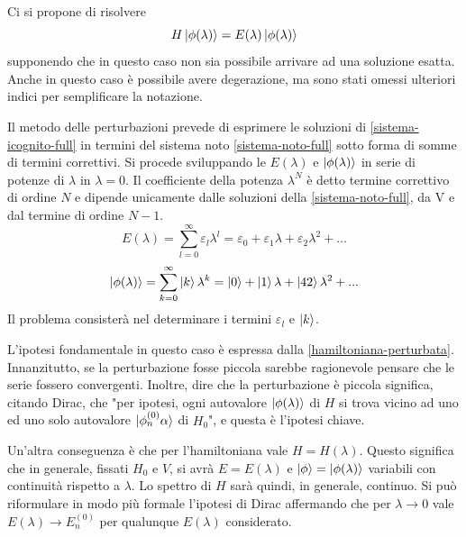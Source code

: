 \documentclass[a4paper, 10pt]{article}
\newcommand{\reff}[1]{\mbox{\ref{#1}}}
\begin{document}
Ci si propone di risolvere
\begin{equation}
	\label{sistema-icognito-full}
	H \ket{\phi(\lambda)} = E(\lambda) \ket{\phi(\lambda)}
\end{equation}
supponendo che in questo caso non sia possibile arrivare ad una soluzione esatta. Anche in questo caso è possibile avere degerazione, ma sono stati omessi ulteriori indici per semplificare la notazione.

Il metodo delle perturbazioni prevede di esprimere le soluzioni di \reff{sistema-icognito-full} in termini del sistema noto \reff{sistema-noto-full} sotto forma di somme di termini correttivi. Si procede sviluppando le $E(\lambda)$ e $\ket{\phi(\lambda)}$ in serie di potenze di $\lambda$ in $\lambda = 0$. Il coefficiente della potenza $\lambda^N$ è detto termine correttivo di ordine $N$ e dipende unicamente dalle soluzioni della \reff{sistema-noto-full}, da V e dal termine di ordine $N-1$.
\begin{equation}
	\label{serie-generale-E}
	E(\lambda) = \sum_{l = 0}^{\infty} \varepsilon_l \lambda^l = \varepsilon_0 + \varepsilon_1 \lambda+ \varepsilon_2 \lambda^2 + ...
\end{equation}
\begin{equation}
	\label{serie-generale-phi}
	\ket{\phi(\lambda)} = \sum_{k = 0}^{\infty} \ket{k} \lambda^k = \ket{0} + \ket{1}\lambda + \ket{42}\lambda^2 + ...
\end{equation}
Il problema consisterà nel determinare i termini $\varepsilon_l$ e $\ket{k}$.

L'ipotesi fondamentale in questo caso è espressa dalla \reff{hamiltoniana-perturbata}. Innanzitutto, se la perturbazione fosse piccola sarebbe ragionevole pensare che le serie fossero convergenti. Inoltre, dire che la perturbazione è piccola significa, citando Dirac, che "per ipotesi, ogni autovalore $\ket{\phi(\lambda)}$ di $H$ si trova vicino ad uno ed uno solo autovalore $\ket{\phi_n^{(0)} \alpha}$ di $H_0$", e questa è l'ipotesi chiave.

Un'altra conseguenza è che per l'hamiltoniana vale $H = H(\lambda)$. Questo significa che in generale, fissati $H_0$ e $V$, si avrà $E = E(\lambda)$ e $\ket{\phi} = \ket{\phi(\lambda)}$ variabili con continuità rispetto a $\lambda$. Lo spettro di $H$ sarà quindi, in generale, continuo. Si può riformulare in modo più formale l'ipotesi di Dirac affermando che per $\lambda \to 0 $ vale $E(\lambda) \to E_n^{(0)}$ per qualunque $E(\lambda)$ considerato.
\end{document}
